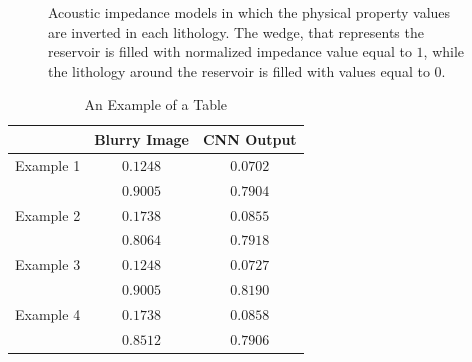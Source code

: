 \documentclass[conference,compsoc]{IEEEtran}
\begin{document}
\begin{figure}[!t]
{\label{fig_scenario6_blurred}}
\hfil
{}
\caption{Acoustic impedance models in which the physical property values are inverted in each lithology.
The wedge, that represents the reservoir is filled with normalized impedance value equal to $1$, while
the lithology around the reservoir is filled with values equal to $0$. }
\label{fig_scenario6}
\end{figure}


\begin{table}[!t]
\renewcommand{\arraystretch}{1.3}
\caption{An Example of a Table}
\label{table_caso_2}
\centering
\begin{tabular}{|c||c||c|}
\hline
 & Blurry Image & CNN Output \\
\hline
Example 1 & $0.1248$ & $0.0702$\\
\hline
	  & $0.9005$ & $0.7904$\\
\hline
Example 2 & $0.1738$ & $0.0855$ \\
\hline
	  & $0.8064$ & $0.7918$\\
\hline
Example 3 & $0.1248$ & $0.0727$\\
\hline
	  & $0.9005$ & $0.8190$\\
\hline
Example 4 & $0.1738$ & $0.0858$\\
\hline
	  & $0.8512$ & $0.7906$\\
\hline
\end{tabular}
\end{table}
\end{document}
